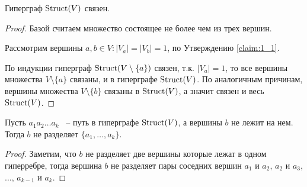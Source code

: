 \documentclass[../main.tex]{subfiles}
\begin{document}
\begin{customclaim}{1.2} \label{claim:1_2}
	Гиперграф $\operatorname{Struct}(V)$ связен.
\end{customclaim}

\begin{proof}
	Базой считаем множество состоящее не более чем из трех вершин.

	Рассмотрим вершины $a, b \in V \colon |V_a| = |V_b| = 1$, по Утверждению \ref{claim:1_1}.

	По индукции гиперграф  $\operatorname{Struct}(V \setminus \{a\})$ связен, т.к. $|V_a| = 1$, то все вершины множества  $V \setminus \{a\}$ связаны, и в гиперграфе $\operatorname{Struct}(V)$.
	По аналогичным причинам, вершины множества $V \setminus \{b\}$ связаны в $\operatorname{Struct}(V)$, а значит связен и весь $\operatorname{Struct}(V)$.
\end{proof}

\begin{customclaim}{1.3} \label{claim:1_3}
	Пусть $a_1a_2 \ldots a_k$ ~-- путь в гиперграфе $\operatorname{Struct}(V)$, а вершины $b$ не лежит на нем. Тогда $b$ не разделяет $\{a_1, \ldots, a_k\}$.
\end{customclaim}

\begin{proof}
	Заметим, что $b$ не разделяет две вершины которые лежат в одном гиперребре, тогда вершина $b$ не разделяет пары соседних вершин $a_1$ и $a_2$, $a_2$ и $a_3$, $\ldots$,  $a_{k - 1}$ и  $a_k$.
\end{proof}
\end{document}
